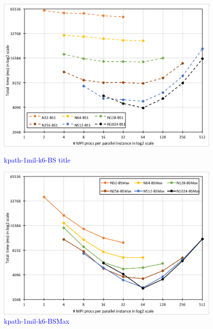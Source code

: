 \begin{figure}[!htb]
    \centering
    \begin{minipage}{0.23\textwidth}
        \centering        
        \includegraphics[width=1\columnwidth]{img/kpath-N1N/1mil-k6-BS1.png}
        \caption{\textcolor{blue}{kpath-1mil-k6-BS title}}
        \label{fig:fig-kpath-1mil-k6-BS1.png}
    \end{minipage}
    \hspace{0mm}
    \begin{minipage}{0.23\textwidth}
        \centering
        \includegraphics[width=1\columnwidth]{img/kpath-N1N/1mil-k6-BSMax.png}
        \caption{\textcolor{blue}{kpath-1mil-k6-BSMax}}
        \label{fig:fig-kpath-1mil-k6-BSMax.png}
    \end{minipage}  
    \hspace{0mm}

\end{figure}
